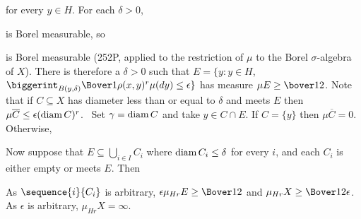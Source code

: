 {\noindent for every $y\in H$.   For each $\delta>0$,


\noindent is Borel measurable, so


\noindent is Borel measurable (252P, applied to the restriction of $\mu$ to
the Borel $\sigma$-algebra of $X$).   There is therefore a $\delta>0$ such
that $E=\{y:y\in H$,
$\biggerint_{B(y,\delta)}\Bover1{\rho(x,y)^r}\mu(dy)\le\epsilon\}$ has
measure
$\mu E\ge\bover12$.   Note that if $C\subseteq X$ has diameter less than or
equal to $\delta$ and meets $E$ then
$\mu\overline{C}\le\epsilon(\mathop{\text{diam}} C)^r$.   \Prf\ Set $\gamma=\mathop{\text{diam}} C$ and
take $y\in C\cap E$.   If $C=\{y\}$ then $\mu\overline{C}=0$.   Otherwise,


Now suppose that $E\subseteq\bigcup_{i\in I}C_i$ where
$\mathop{\text{diam}} C_i\le\delta$ for every $i$, and each $C_i$ is either empty or meets
$E$.   Then


\noindent As $\sequence{i}{C_i}$ is arbitrary,
$\epsilon\mu_{Hr}E\ge\Bover12$ and $\mu_{Hr}X\ge\Bover1{2\epsilon}$.
As $\epsilon$ is arbitrary, $\mu_{Hr}X=\infty$.
}%

